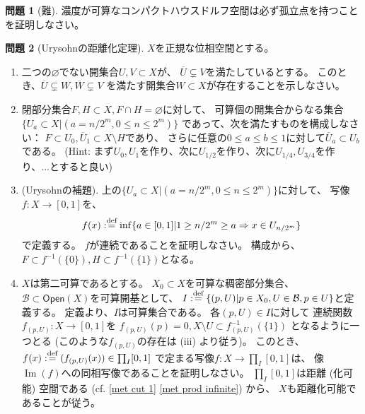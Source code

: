 \documentclass[uplatex]{jsarticle}
\theoremstyle{definition}
\newtheorem{prob}[prob]{問題}
\DeclareMathOperator{\im}{\mathrm{Im}}
\renewcommand{\emptyset}{\varnothing}
\newcommand{\dfn}{:\overset{\mbox{{\scriptsize def}}}{=}}
\newcommand{\mcB}{\mathcal{B}}
\begin{document}
\begin{prob}[難]
  濃度が可算なコンパクトハウスドルフ空間は必ず孤立点を持つことを証明しなさい。
\end{prob}





\begin{prob}[Urysohnの距離化定理]\label{Urysohn metrizable}
  \(X\)を正規な位相空間とする。
  \begin{enumerate}
    \item
    二つの\(\emptyset\)でない開集合\(U,V\subset X\)が、
    \(\overline{U}\subsetneq V\)を満たしているとする。
    このとき、\(\overline{U}\subsetneq W, \overline{W}\subsetneq V\)
    を満たす開集合\(W\subset X\)が存在することを示しなさい。
    \item
    閉部分集合\(F,H\subset X, F\cap H = \emptyset\)に対して、
    可算個の開集合からなる集合\(\{U_a\subset X | (a=n/2^m,0\leq n\leq 2^m)\}\)
    であって、次を満たすものを構成しなさい：
    \(F\subset U_0, \overline{U}_1\subset X\setminus H\)であり、
    さらに任意の\(0\leq a\leq b\leq 1\)に対して\(\overline{U}_a\subset U_b\)である。
    (Hint: まず\(U_0,U_1\)を作り、次に\(U_{1/2}\)を作り、次に\(U_{1/4},U_{3/4}\)を作り、...とすると良い)
    \item (Urysohnの補題).
    \label{Urysohn lem}
    上の\(\{U_a\subset X | (a=n/2^m,0\leq n\leq 2^m)\}\)に対して、
    写像\(f:X\to [0,1]\)を、
    \[f(x) \dfn \inf\{a\in [0,1]| 1\geq n/2^m\geq a \Rightarrow x\in U_{n/2^m}\}\]
    で定義する。
    \(f\)が連続であることを証明しなさい。
    構成から、\(F\subset f^{-1}(\{0\}), H\subset f^{-1}(\{1\})\)となる。
    \item
    \(X\)は第二可算であるとする。
    \(X_0\subset X\)を可算な稠密部分集合、\(\mcB\subset \mathsf{Open}(X)\)を可算開基として、
    \(I\dfn \{(p,U)|p\in X_0,U\in\mcB,p\in U\}\)と定義する。
    定義より、\(I\)は可算集合である。
    各\((p,U)\in I\)に対して
    連続関数\(f_{(p,U)}:X\to [0,1]\)を
    \(f_{(p,U)}(p) = 0, X\setminus U\subset f_{(p,U)}^{-1}(\{1\})\)
    となるように一つとる (このような\(f_{(p,U)}\)の存在は (iii) より従う)。
    このとき、\(f(x)\dfn (f_{(p,U)}(x))\in \prod_I [0,1]\)
    で定まる写像\(f:X\to \prod_I [0,1]\)は、
    像\(\im(f)\)への同相写像であることを証明しなさい。
    \(\prod_I [0,1]\)は距離 (化可能) 空間である
    (cf. \autoref{met cut 1} \ref{met prod infinite}) から、
    \(X\)も距離化可能であることが従う。
  \end{enumerate}
\end{prob}
\end{document}
